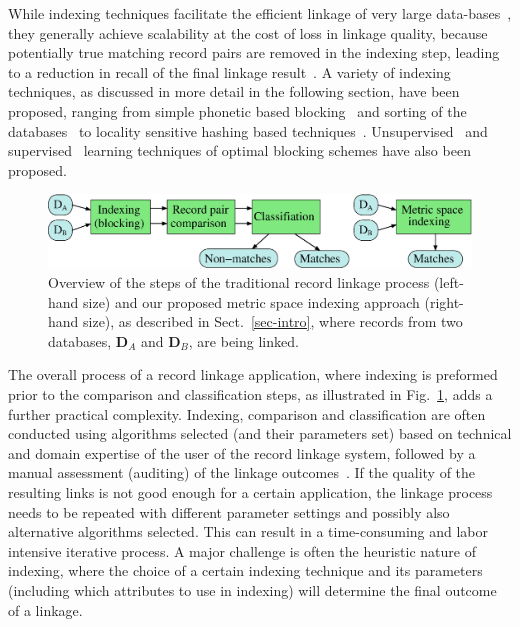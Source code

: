 \documentclass{llncs}
\begin{document}
While indexing techniques facilitate the efficient linkage of very
large data-bases~\cite{Don15}, they generally achieve scalability at
the cost of loss in linkage quality, because potentially true matching
record pairs are removed in the indexing step, leading to a reduction
in recall of the final linkage result~\cite{Chr12}. A variety of
indexing techniques, as discussed in more detail in the following
section, have been proposed, ranging from simple phonetic based
blocking~\cite{Chr12} and sorting of the databases~\cite{Dra12} to
locality sensitive hashing based techniques~\cite{Kim10,Steorts2014}.
Unsupervised~\cite{Kej13,Ram15} and supervised~\cite{Bil06,Mic06} 
learning techniques of optimal blocking schemes have also been
proposed.

\begin{figure}[!t]
  \centering
  \includegraphics[width=1.0\textwidth]{figures/linkage-process}
  \caption{Overview of the steps of the traditional record linkage
           process (left-hand size) and our proposed metric space
           indexing approach (right-hand size), as described in
           Sect.~\ref{sec-intro}, where records from two databases,
           $\mathbf{D}_A$ and $\mathbf{D}_B$, are being linked.}
           \label{fig-rl-process}
\end{figure}

The overall process of a record linkage application, where indexing is
preformed prior to the comparison and classification steps, as
illustrated in Fig.~\ref{fig-rl-process}, adds a further practical
complexity. Indexing, comparison and classification are often conducted
using algorithms selected (and their parameters set) based on technical
and domain expertise of the user of the record linkage system, followed by a manual
assessment (auditing) of the linkage outcomes~\cite{Chr12}. If the quality of the
resulting links is not good enough for a certain application, the
linkage process needs to be repeated with different parameter settings
and possibly also alternative algorithms selected. This can result in
a time-consuming and labor intensive iterative process. A major
challenge is often the heuristic nature of indexing, where the choice
of a certain indexing technique and its parameters (including which
attributes to use in indexing) will determine the final outcome of a
linkage.
\end{document}
